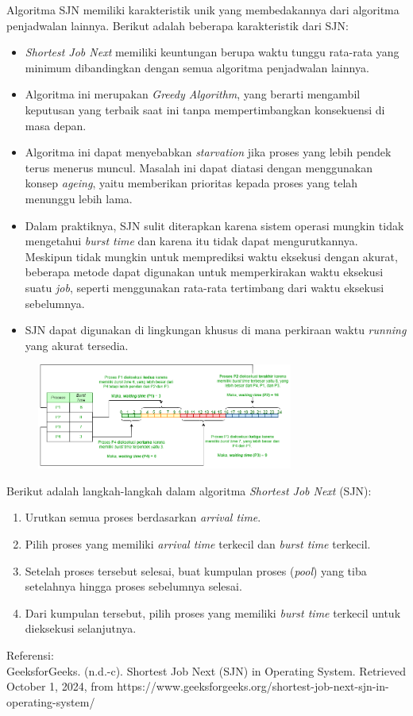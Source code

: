 \documentclass[12pt]{article}
\begin{document}
    Algoritma SJN memiliki karakteristik unik yang membedakannya dari algoritma penjadwalan lainnya. Berikut adalah beberapa karakteristik dari SJN:
    \begin{itemize}
        \item \textit{Shortest Job Next} memiliki keuntungan berupa waktu tunggu rata-rata yang minimum dibandingkan dengan semua algoritma penjadwalan lainnya.
        \item Algoritma ini merupakan \textit{Greedy Algorithm}, yang berarti mengambil keputusan yang terbaik saat ini tanpa mempertimbangkan konsekuensi di masa depan.
        \item Algoritma ini dapat menyebabkan \textit{starvation} jika proses yang lebih pendek terus menerus muncul. Masalah ini dapat diatasi dengan menggunakan konsep \textit{ageing}, yaitu memberikan prioritas kepada proses yang telah menunggu lebih lama.
        \item Dalam praktiknya, SJN sulit diterapkan karena sistem operasi mungkin tidak mengetahui \textit{burst time} dan karena itu tidak dapat mengurutkannya. Meskipun tidak mungkin untuk memprediksi waktu eksekusi dengan akurat, beberapa metode dapat digunakan untuk memperkirakan waktu eksekusi suatu \textit{job}, seperti menggunakan rata-rata tertimbang dari waktu eksekusi sebelumnya.
        \item SJN dapat digunakan di lingkungan khusus di mana perkiraan waktu \textit{running} yang akurat tersedia.
    \end{itemize}
    \begin{figure}[h]
    \centering
    \includegraphics[width=0.75\textwidth]{assets/SJN 2.2.png}
    \label{fig:diagram}
    \end{figure}
    Berikut adalah langkah-langkah dalam algoritma \textit{Shortest Job Next} (SJN):
    \begin{enumerate} 
        \item Urutkan semua proses berdasarkan \textit{arrival time}.
        \item Pilih proses yang memiliki \textit{arrival time} terkecil dan \textit{burst time} terkecil.
        \item Setelah proses tersebut selesai, buat kumpulan proses (\textit{pool}) yang tiba setelahnya hingga proses sebelumnya selesai.
        \item Dari kumpulan tersebut, pilih proses yang memiliki \textit{burst time} terkecil untuk dieksekusi selanjutnya.
    \end{enumerate}
    Referensi:\\
    GeeksforGeeks. (n.d.-c). Shortest Job Next (SJN) in Operating System. Retrieved October 1, 2024, from https://www.geeksforgeeks.org/shortest-job-next-sjn-in-operating-system/
\end{document}
